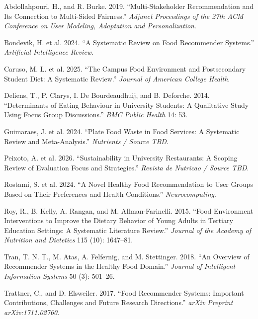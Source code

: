 \documentclass[
  letterpaper,
  DIV=11,
  numbers=noendperiod]{scrartcl}
\newlength{\cslhangindent}
\newenvironment{CSLReferences}[2] %
 {\begin{list}{}{%
  \setlength{\itemindent}{0pt}
  \setlength{\leftmargin}{0pt}
  \setlength{\parsep}{0pt}
  \ifodd #1
   \setlength{\leftmargin}{\cslhangindent}
   \setlength{\itemindent}{-1\cslhangindent}
  \fi
  \setlength{\itemsep}{#2\baselineskip}}}
 {\end{list}}
\begin{document}
\protect{}\label{refs}
\begin{CSLReferences}{1}{1}
Abdollahpouri, H., and R. Burke. 2019. {``Multi-Stakeholder
Recommendation and Its Connection to Multi-Sided Fairness.''}
\emph{Adjunct Proceedings of the 27th ACM Conference on User Modeling,
Adaptation and Personalization}.

{Bondevik, H. et al.} 2024. {``A Systematic Review on Food Recommender
Systems.''} \emph{Artificial Intelligence Review}.

{Caruso, M. L. et al.} 2025. {``The Campus Food Environment and
Postsecondary Student Diet: A Systematic Review.''} \emph{Journal of
American College Health}.

Deliens, T., P. Clarys, I. De Bourdeaudhuij, and B. Deforche. 2014.
{``Determinants of Eating Behaviour in University Students: A
Qualitative Study Using Focus Group Discussions.''} \emph{BMC Public
Health} 14: 53.

{Guimaraes, J. et al.} 2024. {``Plate Food Waste in Food Services: A
Systematic Review and Meta-Analysis.''} \emph{Nutrients / Source TBD}.

{Peixoto, A. et al.} 2026. {``Sustainability in University Restaurants:
A Scoping Review of Evaluation Focus and Strategies.''} \emph{Revista de
Nutricao / Source TBD}.

{Rostami, S. et al.} 2024. {``A Novel Healthy Food Recommendation to
User Groups Based on Their Preferences and Health Conditions.''}
\emph{Neurocomputing}.

Roy, R., B. Kelly, A. Rangan, and M. Allman-Farinelli. 2015. {``Food
Environment Interventions to Improve the Dietary Behavior of Young
Adults in Tertiary Education Settings: A Systematic Literature
Review.''} \emph{Journal of the Academy of Nutrition and Dietetics} 115
(10): 1647--81.

Tran, T. N. T., M. Atas, A. Felfernig, and M. Stettinger. 2018. {``An
Overview of Recommender Systems in the Healthy Food Domain.''}
\emph{Journal of Intelligent Information Systems} 50 (3): 501--26.

Trattner, C., and D. Elsweiler. 2017. {``Food Recommender Systems:
Important Contributions, Challenges and Future Research Directions.''}
\emph{arXiv Preprint arXiv:1711.02760}.


\end{CSLReferences}
\end{document}
